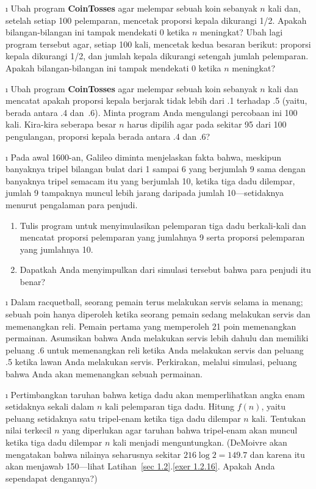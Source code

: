 \exercises
\begin{LJSItem}

\i\label{exer 1.1.1} Ubah program {\bf CoinTosses} agar melempar sebuah koin sebanyak $n$
kali dan, setelah setiap 100 pelemparan, mencetak proporsi kepala dikurangi 1/2.  Apakah 
bilangan-bilangan ini tampak mendekati 0 ketika $n$ meningkat?  Ubah lagi program tersebut agar,
setiap 100 kali, mencetak kedua besaran berikut: proporsi kepala 
dikurangi 1/2, dan jumlah kepala dikurangi setengah jumlah pelemparan.  Apakah bilangan-bilangan ini 
tampak mendekati 0 ketika $n$ meningkat?

\i\label{exer 1.1.2} Ubah program {\bf CoinTosses} agar melempar sebuah
koin sebanyak $n$ kali
dan mencatat apakah proporsi kepala berjarak tidak lebih dari .1 terhadap .5 (yaitu,
berada antara .4 dan~.6).  Minta program Anda mengulangi percobaan ini 100 kali. 
Kira-kira
seberapa besar $n$ harus dipilih agar pada sekitar 95 dari 100 pengulangan,
proporsi
kepala berada antara .4 dan .6?

\i\label{exer 1.1.3} Pada awal 1600-an, Galileo diminta menjelaskan fakta
bahwa,
meskipun banyaknya tripel bilangan bulat dari 1 sampai 6 yang berjumlah 9 sama
dengan
banyaknya tripel semacam itu yang berjumlah 10, ketika tiga dadu dilempar, jumlah 9 tampaknya
muncul lebih jarang daripada jumlah 10---setidaknya menurut pengalaman para penjudi.

\begin{enumerate}
\item Tulis program untuk menyimulasikan pelemparan tiga dadu berkali-kali
dan mencatat proporsi pelemparan yang jumlahnya 9 serta
proporsi pelemparan yang jumlahnya 10.
\item Dapatkah Anda menyimpulkan dari simulasi tersebut bahwa para penjudi itu benar?
\end{enumerate}

\i\label{exer 1.1.4} Dalam racquetball, seorang pemain terus melakukan servis selama
ia menang; sebuah
poin hanya diperoleh ketika seorang pemain sedang melakukan servis dan memenangkan reli.  Pemain pertama
yang memperoleh 21 poin memenangkan permainan.  Asumsikan bahwa Anda melakukan servis lebih dahulu dan memiliki
peluang .6 untuk memenangkan reli ketika Anda melakukan servis dan peluang .5 ketika
lawan Anda
melakukan servis.  Perkirakan, melalui simulasi, peluang bahwa Anda akan memenangkan
sebuah
permainan.

\i\label{exer 1.1.5} Pertimbangkan taruhan bahwa ketiga dadu akan memperlihatkan
angka enam setidaknya sekali dalam $n$ kali pelemparan tiga dadu.  Hitung $f(n)$, yaitu peluang 
setidaknya satu tripel-enam ketika tiga dadu dilempar $n$ kali.  
Tentukan nilai terkecil $n$ yang diperlukan agar taruhan bahwa 
tripel-enam akan muncul ketika tiga dadu dilempar $n$ kali menjadi menguntungkan.  (DeMoivre akan
mengatakan bahwa nilainya
seharusnya sekitar $216\log 2 = 149.7$ dan karena itu akan menjawab 150---lihat
Latihan~\ref{sec 1.2}.\ref{exer 1.2.16}.
Apakah Anda sependapat dengannya?)                           


\end{LJSItem}
